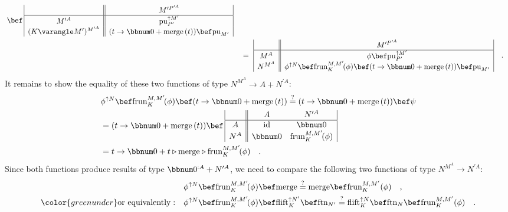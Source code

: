 \begin{align*}
\begin{array}{|c||cc|}
\end{array}\,\bef\,\begin{array}{|c||c|}
 & M^{\prime P^{\prime A}}\\
\hline M^{\prime A} & \text{pu}_{P^{\prime}}^{\uparrow M^{\prime}}\\
(K\varangle M^{\prime})^{M^{\prime A}} & (t\rightarrow\bbnum 0+\text{merge}\,(t))\bef\text{pu}_{M^{\prime}}
\end{array}\\
 & \quad=\,\,\begin{array}{|c||c|}
 & M^{\prime P^{\prime A}}\\
\hline M^{A} & \phi\bef\text{pu}_{P^{\prime}}^{\uparrow M^{\prime}}\\
N^{M^{A}} & \phi^{\uparrow N}\bef\text{frun}_{K}^{M,M^{\prime}}\!(\phi)\bef(t\rightarrow\bbnum 0+\text{merge}\,(t))\bef\text{pu}_{M^{\prime}}
\end{array}\quad.
\end{align*}
It remains to show the equality of these two functions of type $N^{M^{A}}\rightarrow A+N^{\prime A}$:
\begin{align*}
 & \phi^{\uparrow N}\bef\text{frun}_{K}^{M,M^{\prime}}\!(\phi)\bef(t\rightarrow\bbnum 0+\text{merge}\,(t))\overset{?}{=}(t\rightarrow\bbnum 0+\text{merge}\,(t))\bef\psi\\
 & =(t\rightarrow\bbnum 0+\text{merge}\,(t))\bef\,\begin{array}{|c||cc|}
 & A & N^{\prime A}\\
\hline A & \text{id} & \bbnum 0\\
N^{A} & \bbnum 0 & \text{frun}_{K}^{M,M^{\prime}}\!(\phi)
\end{array}\\
 & =t\rightarrow\bbnum 0+t\triangleright\text{merge}\triangleright\text{frun}_{K}^{M,M^{\prime}}\!(\phi)\quad.
\end{align*}
Since both functions produce results of type $\bbnum 0^{:A}+N^{\prime A}$,
we need to compare the following two functions of type $N^{M^{A}}\rightarrow N^{\prime A}$:
\begin{align}
 & \phi^{\uparrow N}\bef\text{frun}_{K}^{M,M^{\prime}}\!(\phi)\bef\text{merge}\overset{?}{=}\text{merge}\bef\text{frun}_{K}^{M,M^{\prime}}(\phi)\quad,\nonumber \\
{\color{greenunder}\text{or equivalently}:}\quad & \phi^{\uparrow N}\bef\text{frun}_{K}^{M,M^{\prime}}\!(\phi)\bef\text{flift}_{K}^{\uparrow N^{\prime}}\bef\text{ftn}_{N^{\prime}}\overset{?}{=}\text{flift}_{K}^{\uparrow N}\bef\text{ftn}_{N}\bef\text{frun}_{K}^{M,M^{\prime}}(\phi)\quad.\label{eq:free-pointed-sw-monadic-naturality-derivation1}
\end{align}

